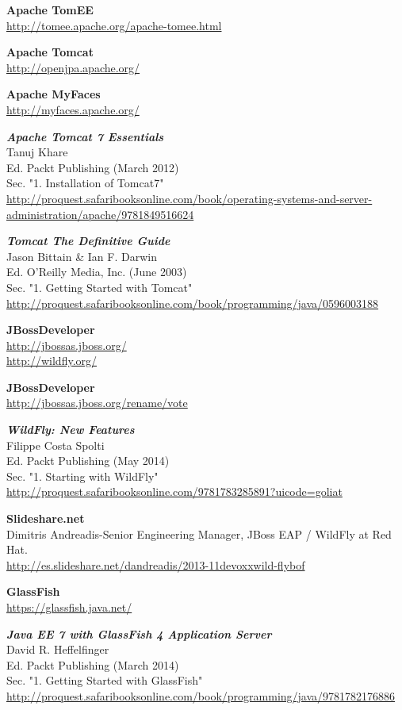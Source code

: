 \documentclass[a4paper, 10pt]{article}
\begin{document}
\begin{thebibliography}{10}
	\textbf{Apache TomEE}\\
		\url{http://tomee.apache.org/apache-tomee.html}

	\textbf{Apache Tomcat}\\
		\url{http://openjpa.apache.org/}

	\textbf{Apache MyFaces}\\
		\url{http://myfaces.apache.org/}

	\textbf{\textit{Apache Tomcat 7 Essentials}}\\
	Tanuj Khare\\
	Ed. Packt Publishing (March 2012)\\
	Sec. "1. Installation of Tomcat7"\\
		\url{http://proquest.safaribooksonline.com/book/operating-systems-and-server-administration/apache/9781849516624}
	
	\textbf{\textit{Tomcat The Definitive Guide}}\\
	Jason Bittain \& Ian F. Darwin\\
	Ed. O'Reilly Media, Inc. (June 2003)\\
	Sec. "1. Getting Started with Tomcat"\\
		\url{http://proquest.safaribooksonline.com/book/programming/java/0596003188}
	
	\textbf{JBossDeveloper}\\
		\url{http://jbossas.jboss.org/}\\
		\url{http://wildfly.org/}
	
	\textbf{JBossDeveloper}\\
		\url{http://jbossas.jboss.org/rename/vote}
	
	\textbf{\textit{WildFly: New Features}}\\
	Filippe Costa Spolti\\
	Ed. Packt Publishing (May 2014)\\
	Sec. "1. Starting with WildFly"\\
		\url{http://proquest.safaribooksonline.com/9781783285891?uicode=goliat} 
	
	\textbf{Slideshare.net}\\
	Dimitris Andreadis-Senior Engineering Manager, JBoss EAP / WildFly at Red Hat.\\
		\url{http://es.slideshare.net/dandreadis/2013-11devoxxwild-flybof}
	
	\textbf{GlassFish}\\
		\url{https://glassfish.java.net/}

	\textbf{\textit{Java EE 7 with GlassFish 4 Application Server}}\\
	David R. Heffelfinger\\
	Ed. Packt Publishing (March 2014)\\
	Sec. "1. Getting Started with GlassFish"\\
		\url{http://proquest.safaribooksonline.com/book/programming/java/9781782176886}
		
\end{thebibliography}
\end{document}
